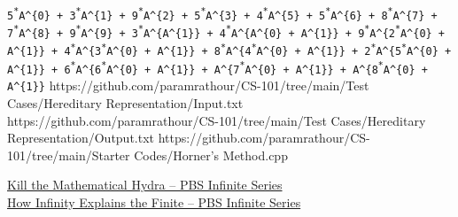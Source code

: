 \begin{testcasesFunctionMore}
{\texttt{5\textsuperscript{*}A\^{}\{0\} + 3\textsuperscript{*}A\^{}\{1\} + 9\textsuperscript{*}A\^{}\{2\} + 5\textsuperscript{*}A\^{}\{3\} + 4\textsuperscript{*}A\^{}\{5\} + 5\textsuperscript{*}A\^{}\{6\} + 8\textsuperscript{*}A\^{}\{7\} + 7\textsuperscript{*}A\^{}\{8\} + 9\textsuperscript{*}A\^{}\{9\} + 3\textsuperscript{*}A\^{}\{A\^{}\{1\}\} + 4\textsuperscript{*}A\^{}\{A\^{}\{0\} + A\^{}\{1\}\} + 9\textsuperscript{*}A\^{}\{2\textsuperscript{*}A\^{}\{0\} + A\^{}\{1\}\} + 4\textsuperscript{*}A\^{}\{3\textsuperscript{*}A\^{}\{0\} + A\^{}\{1\}\} + 8\textsuperscript{*}A\^{}\{4\textsuperscript{*}A\^{}\{0\} + A\^{}\{1\}\} + 2\textsuperscript{*}A\^{}\{5\textsuperscript{*}A\^{}\{0\} + A\^{}\{1\}\} + 6\textsuperscript{*}A\^{}\{6\textsuperscript{*}A\^{}\{0\} + A\^{}\{1\}\} + A\^{}\{7\textsuperscript{*}A\^{}\{0\} + A\^{}\{1\}\} + A\^{}\{8\textsuperscript{*}A\^{}\{0\} + A\^{}\{1\}\}}}
	{https://github.com/paramrathour/CS-101/tree/main/Test Cases/Hereditary Representation/Input.txt}
	{https://github.com/paramrathour/CS-101/tree/main/Test Cases/Hereditary Representation/Output.txt}
	{https://github.com/paramrathour/CS-101/tree/main/Starter Codes/Horner's Method.cpp}
\end{testcasesFunctionMore}
\begin{funvideo}
\href{https://youtu.be/uWwUpEY4c8o}{Kill the Mathematical Hydra -- PBS Infinite Series}\\
\href{https://youtu.be/oBOZ2WroiVY}{How Infinity Explains the Finite -- PBS Infinite Series}
\end{funvideo}
\recalctypearea